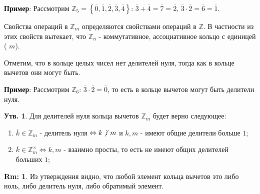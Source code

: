 \documentclass[12pt]{article}
\newcommand{\MZ}{\mathbb{Z}}
\theoremstyle{definition}
\newtheorem{rem}{Rm:}
\newtheorem{prop}{Утв.}
\DeclareRobustCommand{\divby}{%
	\mathrel{\text{\vbox{\baselineskip.65ex\lineskiplimit0pt\hbox{.}\hbox{.}\hbox{.}}}}%
}
\DeclareRobustCommand{\ndivby}{\mkern-1mu\not\mathrel{\mkern4.5mu\divby}\mkern1mu}
\newcommand{\ovl}[1]{\overline{#1}}
\begin{document}
\textbf{Пример}: Рассмотрим $\MZ_5 =\left\{\ovl{0}, \ovl{1}, \ovl{2}, \ovl{3}, \ovl{4}\right\}$: $\ovl{3} + \ovl{4} = \ovl{7} = \ovl{2}, \, \ovl{3}{\cdot}\ovl{2} = \ovl{6} = \ovl{1}$.

Свойства операций в $\MZ_m$ определяются свойствами операций в $\MZ$. В частности из этих свойств вытекает, что $\MZ_n$ - коммутативное, ассоциативное кольцо с единицей ( $m$).

Отметим, что в кольце целых чисел нет делителей нуля, тогда как в кольце вычетов они могут быть.

\textbf{Пример}: Рассмотрим $\MZ_6$: $\ovl{3}{\cdot}\ovl{2} = \ovl{0}$, то есть в кольце вычетов могут быть делители нуля.

\begin{prop}
	Для делителей нуля кольца вычетов $\MZ_m$ будет верно следующее:
	\begin{enumerate}[label=\arabic*)]
		\item $\ovl{k} \in \MZ_m$ - делитель нуля $\Leftrightarrow k \ndivby m$ и $k,m$ - имеют общие делители больше $1$;
		\item $\ovl{k} \in \MZ_m^{\times} \Leftrightarrow k,m$ - взаимно просты, то есть не имеют общих делителей больших $1$;
	\end{enumerate}
\end{prop}
\begin{rem}
	Из утверждения видно, что любой элемент кольца вычетов это либо ноль, либо делитель нуля, либо обратимый элемент.
\end{rem}
\end{document}
